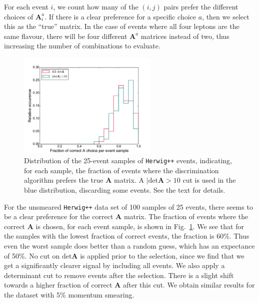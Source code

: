 \documentclass[twoside,english]{uiofysmaster}
\begin{document}
For each event $i$, we count how many of the $(i,j)$ pairs prefer the different choices of $\mathbf{A}_i^a$. If there is a clear preference for a specific choice $a$, then we select this as the ``true'' matrix. In the case of events where all four leptons are the same flavour, there will be four different $\mathbf{A}^a$ matrices instead of two, thus increasing the number of combinations to evaluate.
\begin{figure}[hbtp!]
	\centering
		\includegraphics[width=0.6\textwidth]{figures/improving_combinatorics/histogram-pairwise_A_selection-fraction_of_corr_A.pdf} 
	\caption{Distribution of the 25-event samples of {\tt Herwig++} events, indicating, for each sample, the fraction of events where the discrimination algorithm prefers the true $\mathbf{A}$ matrix. A $|\mathrm{det}\mathbf A > 10$ cut is used in the blue distribution, discarding some events. See the text for details.}
	\label{fig:correct_A_preference_distribution}
\end{figure}

For the unsmeared {\tt Herwig++} data set of 100 samples of 25 events, there seems to be a clear preference for the correct $\mathbf A$ matrix. The fraction of events where the correct $\mathbf A$ is chosen, for each event sample, is shown in Fig.\ \ref{fig:correct_A_preference_distribution}. We see that for the samples with the lowest fraction of correct events, the fraction is 60\%. Thus even the worst sample does better than a random guess, which has an expectance of 50\%. No cut on $\mathrm{det}\mathbf{A}$ is applied prior to the selection, since we find that we get a significantly clearer signal by including all events. We also apply a determinant cut to remove events after the selection. There is a slight shift towards a higher fraction of correct $\mathbf{A}$ after this cut. We obtain similar results for the dataset with 5\% momentum smearing.
\end{document}
